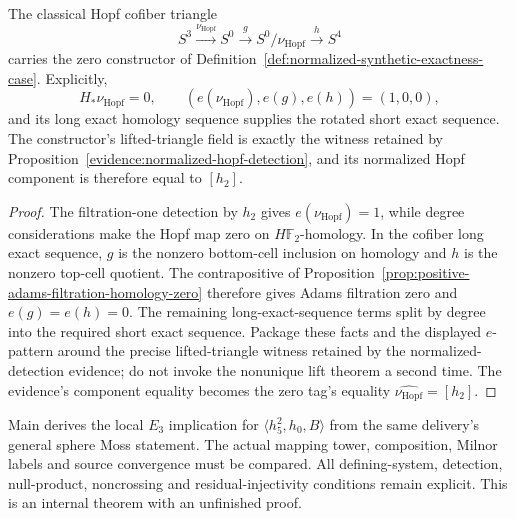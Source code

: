 \begin{lemma}
  \label{lem:normalized-hopf-exactness-case}
  \notready
  The classical Hopf cofiber triangle
  \[
    S^3\xrightarrow{\nu_{\mathrm{Hopf}}}S^0\xrightarrow g
    S^0/\nu_{\mathrm{Hopf}}\xrightarrow hS^4
  \]
  carries the zero constructor of
  Definition~\ref{def:normalized-synthetic-exactness-case}.  Explicitly,
  \[
    H_*\nu_{\mathrm{Hopf}}=0,
    \qquad
    (e(\nu_{\mathrm{Hopf}}),e(g),e(h))=(1,0,0),
  \]
  and its long exact homology sequence supplies the rotated short exact
  sequence.  The constructor's lifted-triangle field is exactly the witness
  retained by Proposition~\ref{evidence:normalized-hopf-detection}, and its
  normalized Hopf component is therefore equal to $[h_2]$.
\end{lemma}

\begin{proof}
  The filtration-one detection by $h_2$ gives
  $e(\nu_{\mathrm{Hopf}})=1$, while degree considerations make the Hopf map
  zero on $H\mathbb F_2$-homology.  In the cofiber long exact sequence, $g$
  is the nonzero bottom-cell inclusion on homology and $h$ is the nonzero
  top-cell quotient.  The contrapositive of
  Proposition~\ref{prop:positive-adams-filtration-homology-zero} therefore
  gives Adams filtration zero and $e(g)=e(h)=0$.  The remaining
  long-exact-sequence terms split by degree into
  the required short exact sequence.  Package these facts and the displayed
  $e$-pattern around the precise lifted-triangle witness retained by the
  normalized-detection evidence; do not invoke the nonunique lift theorem a
  second time.  The evidence's component equality becomes the zero tag's
  equality $\widehat{\nu_{\mathrm{Hopf}}}=[h_2]$.
\end{proof}
\begin{theorem}
  \label{thm:main-local-moss-specialization}
  \notready
  Main derives the local $E_3$ implication for
  $\langle h_5^2,h_0,B\rangle$ from the same delivery's general sphere
  Moss statement. The actual mapping tower, composition, Milnor labels and
  source convergence must be compared. All defining-system, detection,
  null-product, noncrossing and residual-injectivity conditions remain
  explicit. This is an internal theorem with an unfinished proof.
\end{theorem}


